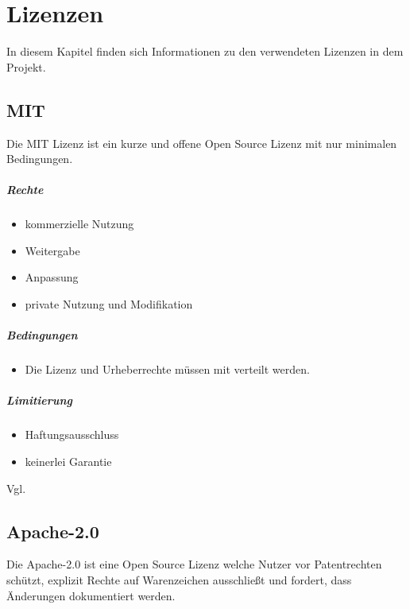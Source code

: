 \chapter{Lizenzen}\label{ch:lizenzen}

In diesem Kapitel finden sich Informationen zu den verwendeten Lizenzen in dem Projekt.

\section{MIT}\label{sec:mit}
Die MIT Lizenz ist ein kurze und offene Open Source Lizenz mit nur minimalen Bedingungen.

\paragraph{Rechte}
\begin{itemize}
    \item kommerzielle Nutzung
    \item Weitergabe
    \item Anpassung
    \item private Nutzung und Modifikation
\end{itemize}

\paragraph{Bedingungen}
\begin{itemize}
    \item Die Lizenz und Urheberrechte müssen mit verteilt werden.
\end{itemize}

\paragraph{Limitierung}
\begin{itemize}
    \item Haftungsausschluss
    \item keinerlei Garantie
\end{itemize}
Vgl. \cite{choosealicense-com}

\section{Apache-2.0}\label{sec:apache-2.0}

Die Apache-2.0 ist eine Open Source Lizenz welche Nutzer vor Patentrechten schützt,
explizit Rechte auf Warenzeichen ausschließt und fordert, dass Änderungen dokumentiert werden.

